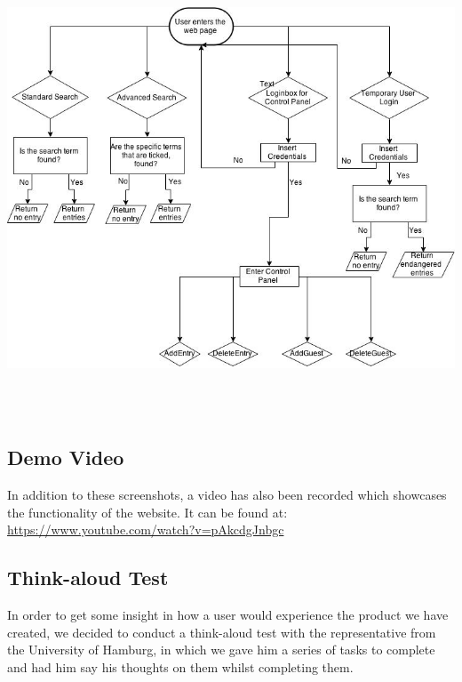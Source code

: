 \documentclass[12pt,a4paper]{article}
\begin{document}
\includegraphics[height=135mm]{Flowchart.png}

\subsection{Demo Video}
In addition to these screenshots, a video has also been recorded which showcases the functionality of the website. It can be found at: \url{https://www.youtube.com/watch?v=pAkcdgJnbgc}

\newpage
\subsection{Think-aloud Test}
In order to get some insight in how a user would experience the product we have created, we decided to conduct a think-aloud test with the representative from the University of Hamburg, in which we gave him a series of tasks to complete and had him say his thoughts on them whilst completing them.
\end{document}

